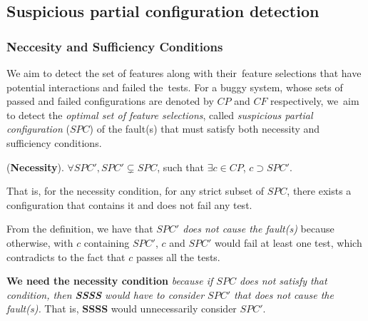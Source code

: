 \subsection{Suspicious partial configuration detection}
\label{SPC_detection_section}

%
%

\subsubsection{Neccesity and Sufficiency Conditions}

We aim to detect the set of features along with their~feature
selections that have potential interactions and failed the~tests.  For
a buggy system, whose sets of passed and failed configurations are
denoted by $CP$ and $CF$ respectively, we~aim to detect the {\em
  optimal set of feature selections}, called {\em suspicious
  partial configuration} ($SPC$) of the fault(s) that must satisfy
both necessity and sufficiency conditions.



\begin{Definition}{({\bf Necessity}).}
$\forall SPC', SPC' \subsetneq SPC$, such that $\exists c \in CP$, $c
  \supset SPC'$.
\end{Definition}

That is, for the necessity condition, for any strict subset of $SPC$,
there exists a configuration that contains it and does not fail any
test.

From the definition, we have that {\em $SPC'$ does not cause the
  fault(s)} because otherwise, with $c$ containing $SPC'$, $c$ and
$SPC'$ would fail at least one test, which contradicts to the fact
that $c$ passes all the tests.

{\bf We need the necessity condition} {\em because if $SPC$ does not
  satisfy that condition, then \textbf{SSSS} would have to consider
  $SPC'$ that does not cause the fault(s).} That is, \textbf{SSSS}
would unnecessarily consider $SPC'$.

